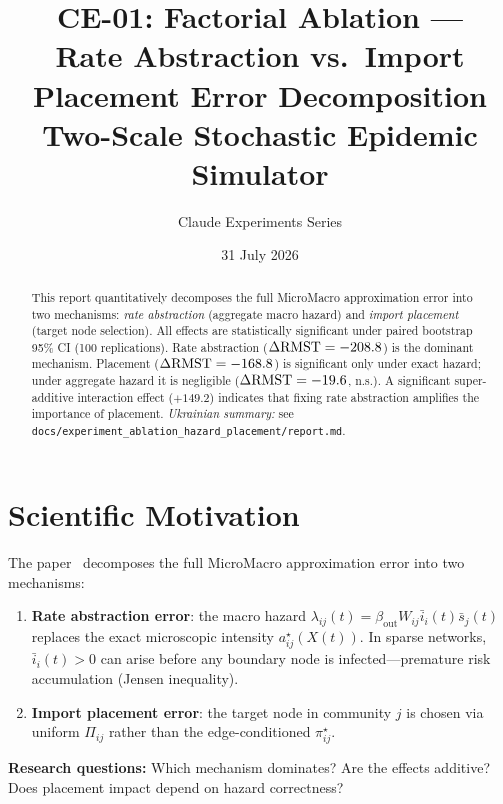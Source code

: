 \documentclass[11pt,a4paper]{article}
\title{\textbf{CE-01: Factorial Ablation ---\\
Rate Abstraction vs.\ Import Placement Error Decomposition}\\[0.5em]
\large Two-Scale Stochastic Epidemic Simulator}
\author{Claude Experiments Series}
\date{31 July 2026}
\begin{document}
\maketitle

\begin{abstract}
This report quantitatively decomposes the full MicroMacro approximation error
into two mechanisms: \emph{rate abstraction} (aggregate macro hazard) and
\emph{import placement} (target node selection).
All effects are statistically significant under paired bootstrap 95\% CI
(100 replications).
Rate abstraction ($\Delta\mathrm{RMST} = -208.8$) is the dominant mechanism.
Placement ($\Delta\mathrm{RMST} = -168.8$) is significant only under exact hazard;
under aggregate hazard it is negligible ($\Delta\mathrm{RMST} = -19.6$, n.s.).
A significant super-additive interaction effect ($+149.2$) indicates
that fixing rate abstraction amplifies the importance of placement.
\textit{Ukrainian summary: }
see \texttt{docs/experiment\_ablation\_hazard\_placement/report.md}.
\end{abstract}

\tableofcontents
\clearpage

\section{Scientific Motivation}

The paper~\cite{main} decomposes the full MicroMacro approximation error into
two mechanisms:
\begin{enumerate}
  \item \textbf{Rate abstraction error}: the macro hazard
        $\lambda_{ij}(t) = \beta_{\mathrm{out}} W_{ij} \bar{i}_i(t)\bar{s}_j(t)$
        replaces the exact microscopic intensity $a^{\star}_{ij}(X(t))$.
        In sparse networks, $\bar{i}_i(t) > 0$ can arise before any boundary
        node is infected---premature risk accumulation (Jensen inequality).
  \item \textbf{Import placement error}: the target node in community $j$
        is chosen via uniform $\Pi_{ij}$ rather than the
        edge-conditioned $\pi^{\star}_{ij}$.
\end{enumerate}

\textbf{Research questions:} Which mechanism dominates?
Are the effects additive? Does placement impact depend on hazard correctness?
\end{document}
